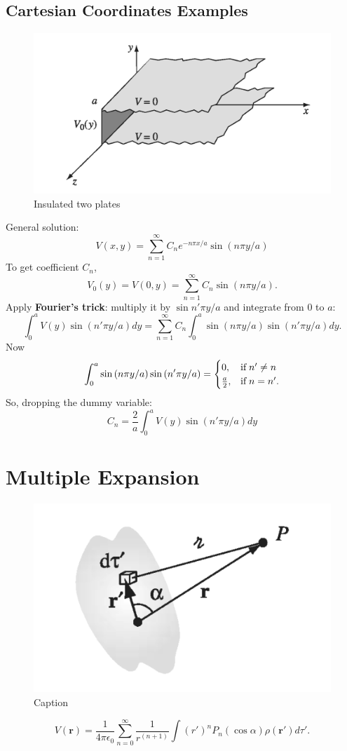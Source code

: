 \documentclass{report}
\begin{document}
\subsection{Cartesian Coordinates Examples}
\begin{figure}[h]
    \centering
    \includegraphics[width = 0.4 \textwidth]{figure/Chapter3/Ep3.3.png}
    \caption{Insulated two plates}
    \label{fig:ep3.3}
\end{figure}
General solution: 
\begin{equation}
    V(x,y) = \sum_{n=1}^\infty C_n e^{-n\pi x/a} \sin{(n\pi y/a)}
\end{equation}
To get coefficient $C_n$,
\begin{equation}
    V_0(y) = V(0,y) = \sum_{n=1}^\infty C_n \sin{(n\pi y/a)}.
\end{equation}
Apply \textbf{Fourier's trick}: multiply it by $\sin{n'\pi y/a}$ and integrate from 0 to $a$: 
\begin{equation}
    \int_0^a V(y) \sin{(n'\pi y/a)} dy = \sum_{n=1}^\infty C_n \int_0^a \sin{(n\pi y/a)}\sin{(n'\pi y/a)}dy.
\end{equation}
Now \begin{equation}
    \int_0^a \sin{(n\pi y/a)}\sin{(n'\pi y/a)} = \begin{cases}
      0, & \text{if\;} n' \neq n\\
      \frac{a}{2}, & \text{if\;} n = n'.
    \end{cases}
\end{equation}
So, dropping the dummy variable: \begin{equation}
    C_n = \frac{2}{a}\int_0^a V(y) \sin{(n'\pi y/a)} dy
\end{equation}


\section{Multiple Expansion}

\begin{figure}[h!]
    \centering
    \includegraphics[width = 0.5 \textwidth]{figure/Chapter3/localized_charge_distribution.png}
    \caption{Caption}
    \label{fig:my_label}
\end{figure}
\begin{equation}
    V(\mathbf{r}) = \frac{1}{4 \pi \epsilon_0} \sum_{n = 0}^\infty \frac{1}{r^{(n+1)}} \int (r')^n P_n(\cos{\alpha})\rho(\mathbf{r}') d\tau'.
\end{equation}
\end{document}
